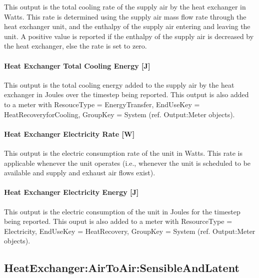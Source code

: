This output is the total cooling rate of the supply air by the heat exchanger in Watts. This rate is determined using the supply air mass flow rate through the heat exchanger unit, and the enthalpy of the supply air entering and leaving the unit. A positive value is reported if the enthalpy of the supply air is decreased by the heat exchanger, else the rate is set to zero.

\paragraph{Heat Exchanger Total Cooling Energy {[}J{]}}\label{heat-exchanger-total-cooling-energy-j}

This output is the total cooling energy added to the supply air by the heat exchanger in Joules over the timestep being reported. This output is also added to a meter with ResouceType = EnergyTransfer, EndUseKey = HeatRecoveryforCooling, GroupKey = System (ref. Output:Meter objects).

\paragraph{Heat Exchanger Electricity Rate {[}W{]}}\label{heat-exchanger-electric-power-w}

This output is the electric consumption rate of the unit in Watts. This rate is applicable whenever the unit operates (i.e., whenever the unit is scheduled to be available and supply and exhaust air flows exist).

\paragraph{Heat Exchanger Electricity Energy {[}J{]}}\label{heat-exchanger-electric-energy-j}

This output is the electric consumption of the unit in Joules for the timestep being reported. This ouput is also added to a meter with ResourceType = Electricity, EndUseKey = HeatRecovery, GroupKey = System (ref. Output:Meter objects).

\subsection{HeatExchanger:AirToAir:SensibleAndLatent}\label{heatexchangerairtoairsensibleandlatent}

